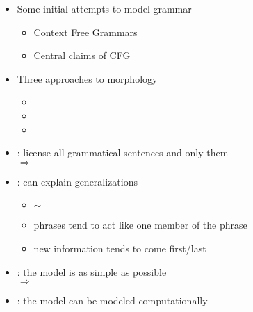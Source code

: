 \documentclass[a4paper,landscape,headrule,footrule]{foils}
\begin{document}
\maketitle

%


\begin{itemize}
\item Some initial attempts to model grammar
  \begin{itemize}
  \item Context Free Grammars
  \item Central claims of CFG
  \end{itemize}
\item Three approaches to morphology
  \begin{itemize}
  \item {} 
  \item {}
  \item {}
  \end{itemize}
\end{itemize}



\begin{itemize}
\item {}: license all grammatical sentences and only them
\\ $\Rightarrow$ 
\item {}: can explain generalizations
  \begin{itemize}
  \item  {} $\sim$  
  \item phrases tend to act like one member of the phrase 
  \item new information tends to come first/last 
  \end{itemize}
\item {}: the model is as simple as possible 
\\ $\Rightarrow$  
\item {}: the model can be modeled computationally
\end{itemize}
\end{document}
